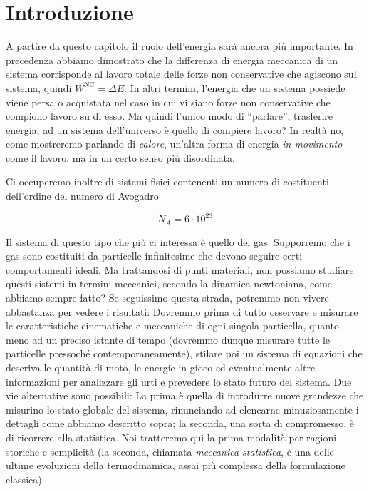 \marginpar{\minitoc}

\section{Introduzione}
A partire da questo capitolo il ruolo dell'energia sarà ancora più
importante. In precedenza abbiamo dimostrato che la differenza di
energia meccanica di un sistema corrisponde al lavoro totale delle
forze non conservative che agiscono sul sistema, quindi $W^\text{NC} = \Delta E$.
In altri termini, l'energia che un sistema possiede viene persa o
acquistata nel caso in cui vi siano forze non conservative che
compiono lavoro su di esso. Ma quindi l'unico modo di ``parlare'',
trasferire energia, ad un sistema dell'universo è quello di compiere
lavoro? In realtà no, come mostreremo parlando di \textit{calore},
un'altra forma di energia \textit{in movimento} come il lavoro, ma
in un certo senso più disordinata.

Ci occuperemo inoltre di sistemi fisici contenenti un numero di
costituenti dell'ordine del numero di Avogadro

\[ N_A = 6 \cdot 10^{23} \]

\noindent Il sistema di questo tipo che più ci interessa è quello
dei gas. Supporremo che i gas sono costituiti da particelle
infinitesime che devono seguire certi comportamenti ideali. Ma
trattandosi di punti materiali, non possiamo studiare questi
sistemi in termini meccanici, secondo la dinamica newtoniana,
come abbiamo sempre fatto? Se seguissimo questa strada, potremmo
non vivere abbastanza per vedere i risultati: Dovremmo prima di
tutto osservare e misurare le caratteristiche cinematiche e
meccaniche di ogni singola particella, quanto meno ad un preciso istante di
tempo (dovremmo dunque misurare tutte le particelle pressoché
contemporaneamente), stilare poi un sistema di equazioni che
descriva le quantità di moto, le energie in gioco ed eventualmente
altre informazioni per analizzare gli urti e prevedere lo stato
futuro del sistema. Due vie alternative sono possibili: La prima è
quella di introdurre nuove grandezze che misurino lo stato globale
del sistema, rinunciando ad elencarne minuziosamente i dettagli come
abbiamo descritto sopra; la seconda, una sorta di compromesso,
è di ricorrere alla statistica. Noi tratteremo qui la prima modalità
per ragioni storiche e semplicità (la seconda, chiamata \textit{meccanica statistica},
è una delle ultime evoluzioni della termodinamica, assai più
complessa della formulazione classica).

